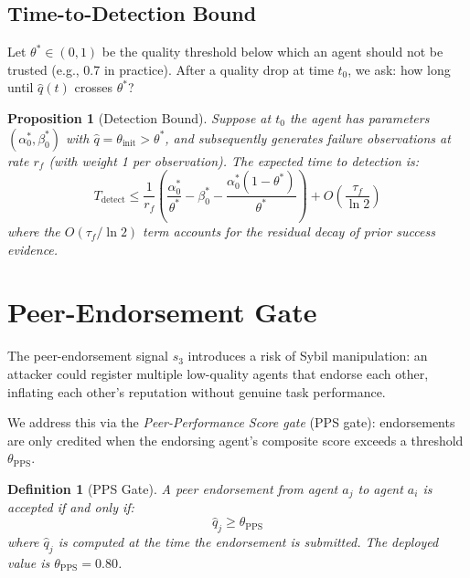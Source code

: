 \documentclass[conference]{IEEEtran}
\newtheorem{proposition}[theorem]{Proposition}
\newtheorem{definition}{Definition}
\begin{document}
\subsection{Time-to-Detection Bound}

Let $\theta^* \in (0, 1)$ be the quality threshold below
which an agent should not be trusted (e.g., 0.7 in practice).
After a quality drop at time $t_0$, we ask: how long until
$\hat{q}(t)$ crosses $\theta^*$?

\begin{proposition}[Detection Bound]
\label{prop:detection}
Suppose at $t_0$ the agent has parameters $(\alpha_0^*,
\beta_0^*)$ with $\hat{q} = \theta_{\text{init}} >
\theta^*$, and subsequently generates failure observations
at rate $r_f$ (with weight 1 per observation). The expected
time to detection is:
\begin{equation}
  T_{\text{detect}} \leq
    \frac{1}{r_f} \left(
      \frac{\alpha_0^*}{\theta^*} - \beta_0^* -
      \frac{\alpha_0^*(1-\theta^*)}{\theta^*}
    \right)
  + O\!\left(\frac{\tau_f}{\ln 2}\right)
  \label{eq:detect_bound}
\end{equation}
where the $O(\tau_f / \ln 2)$ term accounts for the
residual decay of prior success evidence.
\end{proposition}

\section{Peer-Endorsement Gate}
\label{sec:pps}

The peer-endorsement signal $s_3$ introduces a risk of Sybil
manipulation: an attacker could register multiple low-quality
agents that endorse each other, inflating each other's
reputation without genuine task performance.

We address this via the \emph{Peer-Performance Score gate}
(PPS gate): endorsements are only credited when the endorsing
agent's composite score exceeds a threshold $\theta_{\text{PPS}}$.

\begin{definition}[PPS Gate]
\label{def:pps}
A peer endorsement from agent $a_j$ to agent $a_i$ is
accepted if and only if:
\begin{equation}
  \hat{q}_j \geq \theta_{\text{PPS}}
  \label{eq:pps_gate}
\end{equation}
where $\hat{q}_j$ is computed at the time the endorsement
is submitted. The deployed value is $\theta_{\text{PPS}} = 0.80$.
\end{definition}
\end{document}
